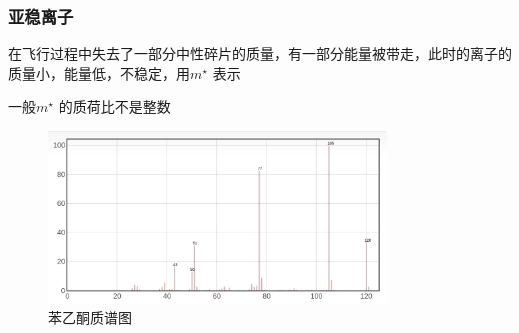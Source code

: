 \subsubsection*{亚稳离子}%
\label{subsub*:亚稳离子}
在飞行过程中失去了一部分中性碎片的质量，有一部分能量被带走，此时的离子的质量小，能量低，不稳定，用$m^\star $ 表示
\begin{notation}
    一般$m^\star $ 的质荷比不是整数
\end{notation}
\begin{figure}[htpb]
    \centering
    \includegraphics[width=0.8\textwidth]{./figures/苯乙酮质谱.png}
    \caption{苯乙酮质谱图}
    \label{fig:-figures-苯乙酮质谱-png}
\end{figure}
